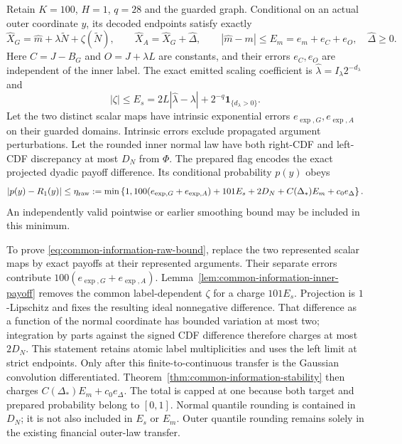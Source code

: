 Retain $K=100$, $H=1$, $q=28$ and the guarded graph. Conditional on an
actual outer coordinate $y$, its decoded endpoints satisfy exactly
\begin{equation}
 \widehat X_G=\widehat m+\lambda\widetilde N+\zeta(\widetilde N),\qquad
 \widehat X_A=\widehat X_G+\widehat\Delta,\qquad
 |\widehat m-m|\leq E_m=e_m+e_C+e_O,\quad
 \widehat\Delta\geq0.
 \label{eq:common-information-raw-endpoints}
\end{equation}
Here $C=J-B_G$ and $O=J+\lambda L$ are constants, and their errors
$e_C,e_O$ are independent of the inner label. The exact emitted scaling
coefficient is $\widehat\lambda=I_\lambda2^{-d_\lambda}$ and
\begin{equation}
 |\zeta|\leq E_s=2L|\widehat\lambda-\lambda|
                    +2^{-q}\mathbf1_{\{d_\lambda>0\}}.
 \label{eq:common-information-scale-error}
\end{equation}
Let the two distinct scalar maps have intrinsic exponential errors
$e_{\exp,G},e_{\exp,A}$ on their guarded domains. Intrinsic errors exclude
propagated argument perturbations. Let the rounded inner normal law have
both right-CDF and left-CDF discrepancy at most $D_N$ from $\Phi$.
The prepared flag encodes the exact projected dyadic payoff difference.
Its conditional probability $p(y)$ obeys
\begin{equation}
 |p(y)-R_1(y)|\leq\eta_{\rm raw}:=
 \min\left\{1,100(e_{\exp,G}+e_{\exp,A})+101E_s+2D_N
                       +C(\Delta_*)E_m+c_0e_\Delta\right\}.
 \label{eq:common-information-raw-bound}
\end{equation}
An independently valid pointwise or earlier smoothing bound may be
included in this minimum.

To prove \eqref{eq:common-information-raw-bound}, replace the two
represented scalar maps by exact payoffs at their represented arguments.
Their separate errors contribute $100(e_{\exp,G}+e_{\exp,A})$.
Lemma~\ref{lem:common-information-inner-payoff} removes the common
label-dependent $\zeta$ for a charge $101E_s$. Projection is
$1$-Lipschitz and fixes the resulting ideal nonnegative difference.
That difference as a function of the normal coordinate has bounded
variation at most two; integration by parts against the signed CDF
difference therefore charges at most $2D_N$. This statement retains
atomic label multiplicities and uses the left limit at strict endpoints.
Only after this finite-to-continuous transfer is the Gaussian
convolution differentiated. Theorem~\ref{thm:common-information-stability}
then charges $C(\Delta_*)E_m+c_0e_\Delta$. The total is capped at one
because both target and prepared probability belong to $[0,1]$.
Normal quantile rounding is contained in $D_N$; it is not also included
in $E_s$ or $E_m$. Outer quantile rounding remains solely in the existing
financial outer-law transfer.

